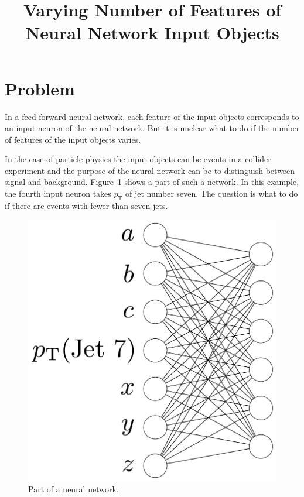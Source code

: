 \documentclass[12pt,a4paper]{article}
\title{Varying Number of Features of Neural Network Input Objects}
\author{}
\date{}
\begin{document}
\maketitle

\section{Problem}

In a feed forward neural network, each feature of the input objects corresponds to an input neuron of the neural network. But it is unclear what to do if the number of features of the input objects varies.

In the case of particle physics the input objects can be events in a collider experiment and the purpose of the neural network can be to distinguish between signal and background. Figure~\ref{fig::NN_picture_1} shows a part of such a network. In this example, the fourth input neuron takes $p_\text{T}$ of jet number seven. The question is what to do if there are events with fewer than seven jets.


\begin{figure}
\begin{center}
\includegraphics[scale=0.4]{NN_picture_1.pdf}
\caption{Part of a neural network.}
\label{fig::NN_picture_1}
\end{center}
\end{figure}
\end{document}
